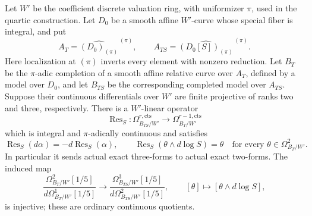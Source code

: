 \begin{lemma}
\label{d2ext:dimtwoFullCohenLaurentResidue}
Let $W'$ be the coefficient discrete valuation ring, with
uniformizer $\pi$, used in the quartic construction.  Let $D_0$
be a smooth affine $W'$-curve whose special fiber is integral,
and put
\[
 A_T=\widehat{(D_0)_{(\pi)}}^{\,(\pi)},\qquad
 A_{TS}=\widehat{(D_0[S])_{(\pi)}}^{\,(\pi)}.
\]
Here localization at $(\pi)$ inverts every element with nonzero
reduction.  Let $B_T$ be the $\pi$-adic completion of a smooth
affine relative curve over $A_T$, defined by a model over $D_0$,
and let $B_{TS}$ be the corresponding completed model over
$A_{TS}$.  Suppose their continuous differentials over $W'$
are finite projective of ranks two and three, respectively.
There is a $W'$-linear operator
\[
 \operatorname{Res}_S:
 \Omega^{r,\mathrm{cts}}_{B_{TS}/W'}
       \longrightarrow \Omega^{r-1,\mathrm{cts}}_{B_T/W'}
\]
which is integral and $\pi$-adically continuous and satisfies
\[
 \operatorname{Res}_S(d\alpha)=-d\operatorname{Res}_S(\alpha),
 \qquad
 \operatorname{Res}_S(\theta\wedge d\log S)=\theta
       \quad\text{for every }\theta\in\Omega^2_{B_T/W'}.
\]
In particular it sends actual exact three-forms to actual exact
two-forms. The induced map
\[
 \frac{\Omega^2_{B_T/W'}[1/5]}
      {d\Omega^1_{B_T/W'}[1/5]}
 \longrightarrow
 \frac{\Omega^3_{B_{TS}/W'}[1/5]}
      {d\Omega^2_{B_{TS}/W'}[1/5]},
 \qquad [\theta]\longmapsto[\theta\wedge d\log S],
\]
is injective; these are ordinary continuous quotients.
\end{lemma}

